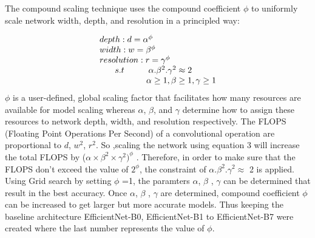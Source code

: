 \documentclass[fleqn,usenatbib]{mnras}
\begin{document}
The compound scaling technique uses the compound coefficient $\phi$ to uniformly scale network width, depth, and resolution in a principled way:

\begin{equation}
    \begin{array}{l}
        depth: d=\alpha^{\phi} \\ 
        width: w=\beta^{\phi} \\ 
        resolution : r=\gamma^{\phi} \\ 
      \hspace{0.25 in}  s.t \hspace{1cm} \alpha.\beta^{2}.\gamma^{2} \approx 2  \\
      \hspace{0.25 in} \hspace{1.3cm} \alpha\geq1, \beta\geq1, \gamma\geq1 
    \end{array}
\end{equation}
$\phi$ is a user-defined, global scaling factor that facilitates how many resources are available for model scaling whereas $\alpha$, $\beta$, and $\gamma$ determine how to assign these resources to network depth, width, and resolution respectively. The FLOPS (Floating Point Operations Per Second) of a convolutional operation are proportional to  $d$, $w^2$, $r^2$. So ,scaling the network using equation 3 will increase the total FLOPS by ($\alpha \times \beta^{2} \times \gamma^{2}) ^ \phi$ . Therefore, in order to make sure that the FLOPS don’t exceed the value of $2^\phi$, the constraint of $\alpha.\beta^{2}.\gamma^{2} \approx$ 2  is applied. Using Grid search by setting $\phi$ =1, the paramters $\alpha$, $\beta$ , $\gamma$ can be determined that result in the best accuracy. Once $\alpha$, $\beta$ , $\gamma$ are determined, compound coefficient $\phi$ can be increased to get larger but more accurate models. Thus keeping the baseline architecture EfficientNet-B0, EfficientNet-B1 to EfficientNet-B7 were created where the last number represents the value of $\phi$.
\end{document}
